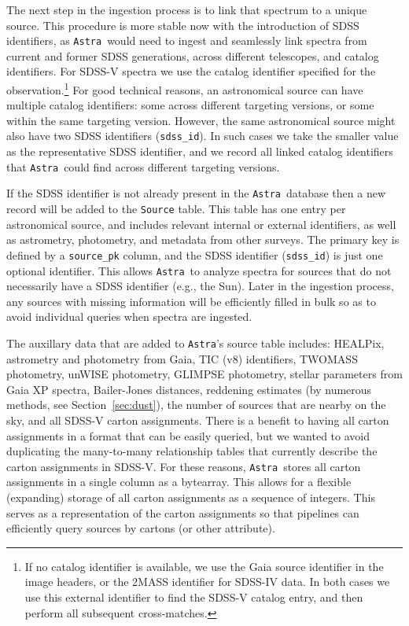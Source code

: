 \documentclass[modern]{aastex631}
\newcommand{\astra}{\texttt{Astra}}
\newcommand{\Astra}{\astra}
\begin{document}
The next step in the ingestion process is to link that spectrum to a unique source. This procedure is more stable now with the introduction of SDSS identifiers, as \Astra\ would need to ingest and seamlessly link spectra from current and former SDSS generations, across different telescopes, and catalog identifiers.
For SDSS-V spectra we use the catalog identifier specified for the observation.\footnote{If no catalog identifier is available, we use the Gaia source identifier in the image headers, or the 2MASS identifier for SDSS-IV data. In both cases we use this external identifier to find the SDSS-V catalog entry, and then perform all subsequent cross-matches.} For good technical reasons, an astronomical source can have multiple catalog identifiers: some across different targeting versions, or some within the same targeting version. However, the same astronomical source might also have two SDSS identifiers (\texttt{sdss\_id}). In such cases we take the smaller value as the representative SDSS identifier, and we record all linked catalog identifiers that \Astra\ could find across different targeting versions.

If the SDSS identifier is not already present in the \Astra\ database then a new record will be added to the \texttt{Source} table. This table has one entry per astronomical source, and includes relevant internal or external identifiers, as well as astrometry, photometry, and metadata from other surveys. The primary key is defined by a \texttt{source\_pk} column, and the SDSS identifier (\texttt{sdss\_id}) is just one optional identifier. This allows \Astra\ to analyze spectra for sources that do not necessarily have a SDSS identifier (e.g., the Sun). Later in the ingestion process, any sources with missing information will be efficiently filled in bulk so as to avoid individual queries when spectra are ingested. 

The auxillary data that are added to \Astra's source table includes: HEALPix, astrometry and photometry from Gaia, TIC (v8) identifiers, TWOMASS photometry, unWISE photometry, GLIMPSE photometry, stellar parameters from Gaia XP spectra, Bailer-Jones distances, reddening estimates (by numerous methods, see Section~\ref{sec:dust}), the number of sources that are nearby on the sky, and all SDSS-V carton assignments. There is a benefit to having all carton assignments in a format that can be easily queried, but we wanted to avoid duplicating the many-to-many relationship tables that currently describe the carton assignments in SDSS-V. For these reasons, \Astra\ stores all carton assignments in a single column as a bytearray. This allows for a flexible (expanding) storage of all carton assignments as a sequence of integers. This  serves as a representation of the carton assignments so that pipelines can efficiently query sources by cartons (or other attribute).
\end{document}
